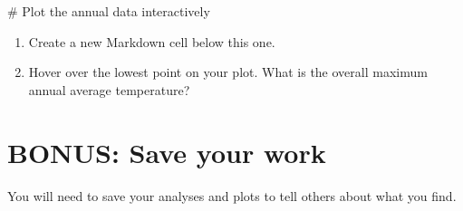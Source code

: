 \documentclass[
  letterpaper,
  DIV=11,
  numbers=noendperiod,
  oneside]{scrreprt}
\newenvironment{Shaded}{\begin{snugshade}}{\end{snugshade}}
\newcommand{\CommentTok}[1]{\textcolor[rgb]{0.37,0.37,0.37}{#1}}
\providecommand{\tightlist}{%
  \setlength{\itemsep}{0pt}\setlength{\parskip}{0pt}}
\begin{document}
\begin{Shaded}
\begin{Highlighting}[]
\CommentTok{\# Plot the annual data interactively}
\end{Highlighting}
\end{Shaded}

\begin{tcolorbox}[enhanced jigsaw, colbacktitle=quarto-callout-color!10!white, opacityback=0, bottomtitle=1mm, toptitle=1mm, bottomrule=.15mm, left=2mm, colframe=quarto-callout-color-frame, leftrule=.75mm, opacitybacktitle=0.6, colback=white, rightrule=.15mm, toprule=.15mm, breakable, titlerule=0mm, title=\textcolor{quarto-callout-color}{\faInfo}\hspace{0.5em}{Try It: Explore the data}, coltitle=black, arc=.35mm]

\begin{enumerate}
\def\labelenumi{\arabic{enumi}.}
\tightlist
\item
  Create a new Markdown cell below this one.
\item
  Hover over the lowest point on your plot. What is the overall maximum
  annual average temperature?
\end{enumerate}

\end{tcolorbox}

\section{BONUS: Save your work}\label{bonus-save-your-work-1}

You will need to save your analyses and plots to tell others about what
you find.
\end{document}
